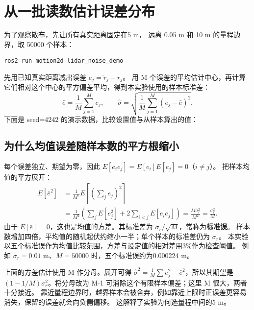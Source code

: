 \section{从一批读数估计误差分布}
为了观察散布，先让所有真实距离固定在5 m，
远离 0.05 m 和 10 m 的量程边界，取 50000 个样本：
\begin{lstlisting}[language=bash,numbers=none]
ros2 run motion2d lidar_noise_demo
\end{lstlisting}
先用已知真实距离减出误差 $e_j=\widetilde r_j-r_j$。
用 M 个误差的平均估计中心，再计算它们相对这个中心的平方偏差平均，得到本实验使用的样本标准差：
\begin{equation}
\bar e=\frac1M\sum_{j=1}^M e_j,\qquad
\widehat\sigma=\sqrt{\frac1M\sum_{j=1}^M(e_j-\bar e)^2}.
\end{equation}
下面是 seed=4242 的演示数据，比较设置值与从样本算出的值：
\begin{center}
\end{center}
\subsection*{为什么均值误差随样本数的平方根缩小}
每个误差独立、期望为零，因此 $E[e_i e_j]=E[e_i]E[e_j]=0$（$i\ne j$）。
把样本均值的平方展开：
\begin{align}
E[\bar e^2]&=\frac1{M^2}E\left[\left(\sum_j e_j\right)^2\right]\\
 &=\frac1{M^2}\left(\sum_jE[e_j^2]+2\sum_{i<j}E[e_ie_j]\right)
 =\frac{M\sigma_r^2}{M^2}=\frac{\sigma_r^2}{M}.
\end{align}
由于 $E[\bar e]=0$，这也是均值的方差。其标准差为 $\sigma_r/\sqrt M$，常称为\textbf{标准误}。
样本数增加四倍，平均值的随机起伏约缩小一半；单个样本的标准差仍为 $\sigma_r$。
本实验以五个标准误作为均值比较范围，方差与设定值的相对差用3\%作为检查阈值。
例如 $\sigma_r=0.01$ m、$M=50000$ 时，五个标准误约为0.000224 m。

上面的方差估计使用 M 作分母。展开可得
$\widehat\sigma^2=\frac1M\sum e_j^2-\bar e^2$，所以其期望是
$(1-1/M)\sigma_r^2$。将分母改为 M-1 可消除这个有限样本偏差；这里 M 很大，两者十分接近。
靠近量程边界时，越界样本会被舍弃，例如靠近上限时正误差更容易消失，保留的误差就会向负侧偏移。
这解释了实验为何选量程中间的5 m。

